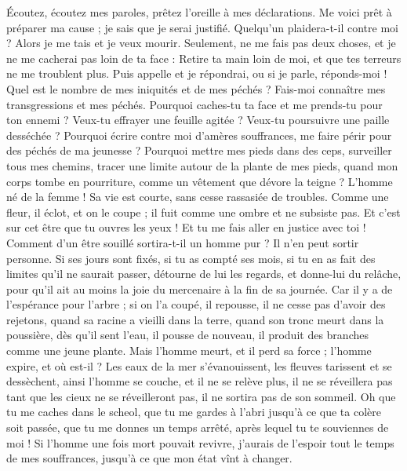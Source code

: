 \begin{multicols}{2}
Écoutez, écoutez mes paroles, prêtez l'oreille à mes déclarations.
Me voici prêt à préparer ma cause ; je sais que je serai justifié.
Quelqu'un plaidera-t-il contre moi ? Alors je me tais et je veux mourir.
Seulement, ne me fais pas deux choses, et je ne me cacherai pas loin de ta face :
Retire ta main loin de moi, et que tes terreurs ne me troublent plus.
Puis appelle et je répondrai, ou si je parle, réponds-moi !
Quel est le nombre de mes iniquités et de mes péchés ? Fais-moi connaître mes transgressions et mes péchés.
Pourquoi caches-tu ta face et me prends-tu pour ton ennemi ?
Veux-tu effrayer une feuille agitée ? Veux-tu poursuivre une paille desséchée ?
Pourquoi écrire contre moi d'amères souffrances, me faire périr pour des péchés de ma jeunesse ?
Pourquoi mettre mes pieds dans des ceps, surveiller tous mes chemins, tracer une limite autour de la plante de mes pieds,
quand mon corps tombe en pourriture, comme un vêtement que dévore la teigne ?
\VerseOne{}L'homme né de la femme ! Sa vie est courte, sans cesse rassasiée de troubles.
Comme une fleur, il éclot, et on le coupe ; il fuit comme une ombre et ne subsiste pas.
Et c'est sur cet être que tu ouvres les yeux ! Et tu me fais aller en justice avec toi !
Comment d'un être souillé sortira-t-il un homme pur ? Il n'en peut sortir personne.
Si ses jours sont fixés, si tu as compté ses mois, si tu en as fait des limites qu'il ne saurait passer,
détourne de lui les regards, et donne-lui du relâche, pour qu'il ait au moins la joie du mercenaire à la fin de sa journée.
Car il y a de l'espérance pour l'arbre ; si on l'a coupé, il repousse, il ne cesse pas d'avoir des rejetons,
quand sa racine a vieilli dans la terre, quand son tronc meurt dans la poussière,
dès qu'il sent l'eau, il pousse de nouveau, il produit des branches comme une jeune plante.
Mais l'homme meurt, et il perd sa force ; l'homme expire, et où est-il ?
Les eaux de la mer s'évanouissent, les fleuves tarissent et se dessèchent,
ainsi l'homme se couche, et il ne se relève plus, il ne se réveillera pas tant que les cieux ne se réveilleront pas, il ne sortira pas de son sommeil.
Oh que tu me caches dans le  scheol, que tu me gardes à l’abri jusqu’à ce que ta colère soit passée, que tu me donnes un temps arrêté, après lequel tu te souviennes de moi !
Si l'homme une fois mort pouvait revivre, j'aurais de l'espoir tout le temps de mes souffrances, jusqu'à ce que mon état vînt à changer.

\end{multicols}

